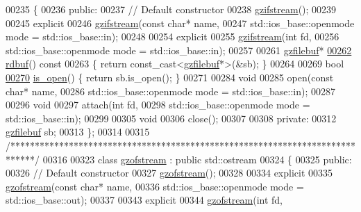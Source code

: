 \begin{DoxyCode}
00235 \{
00236 \textcolor{keyword}{public}:
00237   \textcolor{comment}{//  Default constructor}
00238   \hyperlink{classgzifstream}{gzifstream}();
00239 
00245   \textcolor{keyword}{explicit}
00246   \hyperlink{classgzifstream}{gzifstream}(\textcolor{keyword}{const} \textcolor{keywordtype}{char}* name,
00247              std::ios\_base::openmode mode = std::ios\_base::in);
00248 
00254   \textcolor{keyword}{explicit}
00255   \hyperlink{classgzifstream}{gzifstream}(\textcolor{keywordtype}{int} fd,
00256              std::ios\_base::openmode mode = std::ios\_base::in);
00257 
00261   \hyperlink{classgzfilebuf}{gzfilebuf}*
\hyperlink{classgzifstream_a1c5a0ab4f99f8d8e3406af7bfd82b133}{00262}   \hyperlink{classgzifstream_a1c5a0ab4f99f8d8e3406af7bfd82b133}{rdbuf}()\textcolor{keyword}{ const}
00263 \textcolor{keyword}{  }\{ \textcolor{keywordflow}{return} \textcolor{keyword}{const\_cast<}\hyperlink{classgzfilebuf}{gzfilebuf}*\textcolor{keyword}{>}(&sb); \}
00264 
00269   \textcolor{keywordtype}{bool}
\hyperlink{classgzifstream_a8e9de13b311b698ef0ccc276b71c7941}{00270}   \hyperlink{classgzifstream_a8e9de13b311b698ef0ccc276b71c7941}{is\_open}() \{ \textcolor{keywordflow}{return} sb.is\_open(); \}
00271 
00284   \textcolor{keywordtype}{void}
00285   open(\textcolor{keyword}{const} \textcolor{keywordtype}{char}* name,
00286        std::ios\_base::openmode mode = std::ios\_base::in);
00287 
00296   \textcolor{keywordtype}{void}
00297   attach(\textcolor{keywordtype}{int} fd,
00298          std::ios\_base::openmode mode = std::ios\_base::in);
00299 
00305   \textcolor{keywordtype}{void}
00306   close();
00307 
00308 \textcolor{keyword}{private}:
00312   \hyperlink{classgzfilebuf}{gzfilebuf} sb;
00313 \};
00314 
00315 \textcolor{comment}{/*****************************************************************************/}
00316 
00323 \textcolor{keyword}{class }\hyperlink{classgzofstream}{gzofstream} : \textcolor{keyword}{public} std::ostream
00324 \{
00325 \textcolor{keyword}{public}:
00326   \textcolor{comment}{//  Default constructor}
00327   \hyperlink{classgzofstream}{gzofstream}();
00328 
00334   \textcolor{keyword}{explicit}
00335   \hyperlink{classgzofstream}{gzofstream}(\textcolor{keyword}{const} \textcolor{keywordtype}{char}* name,
00336              std::ios\_base::openmode mode = std::ios\_base::out);
00337 
00343   \textcolor{keyword}{explicit}
00344   \hyperlink{classgzofstream}{gzofstream}(\textcolor{keywordtype}{int} fd,

\end{DoxyCode}
